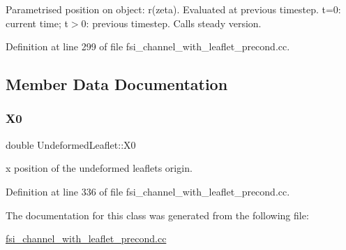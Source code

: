 Parametrised position on object\+: r(zeta). Evaluated at previous timestep. t=0\+: current time; t$>$0\+: previous timestep. Calls steady version. 



Definition at line 299 of file fsi\+\_\+channel\+\_\+with\+\_\+leaflet\+\_\+precond.\+cc.



\subsection{Member Data Documentation}
\mbox{\label{classUndeformedLeaflet_aa89fc695af9e53aa38894c9d875afd36}} 
\subsubsection{\texorpdfstring{X0}{X0}}
{\footnotesize\ttfamily double Undeformed\+Leaflet\+::\+X0\hspace{0.3cm}{\ttfamily [private]}}



x position of the undeformed leaflet\textquotesingle{}s origin. 



Definition at line 336 of file fsi\+\_\+channel\+\_\+with\+\_\+leaflet\+\_\+precond.\+cc.



The documentation for this class was generated from the following file\+:\begin{DoxyCompactItemize}
\item 
\hyperlink{fsi__channel__with__leaflet__precond_8cc}{fsi\+\_\+channel\+\_\+with\+\_\+leaflet\+\_\+precond.\+cc}\end{DoxyCompactItemize}
